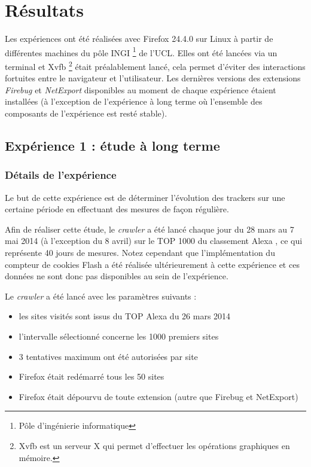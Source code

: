 \chapter{Résultats}
Les expériences ont été réalisées avec Firefox 24.4.0 sur Linux à partir de différentes machines du pôle INGI \footnote{Pôle d'ingénierie informatique} de l'UCL. Elles ont été lancées via un terminal et Xvfb \footnote{Xvfb est un serveur X qui permet d'effectuer les opérations graphiques en mémoire.} était préalablement lancé, cela permet d'éviter des interactions fortuites entre le navigateur et l'utilisateur. Les dernières versions des extensions \textit{Firebug} et \textit{NetExport} disponibles au moment de chaque expérience étaient installées (à l'exception de l'expérience à long terme où l'ensemble des composants de l'expérience est resté stable).

\section{Expérience 1 : étude à long terme}
\subsection{Détails de l'expérience}
Le but de cette expérience est de déterminer l'évolution des trackers sur une certaine période en effectuant des mesures de façon régulière.

Afin de réaliser cette étude, le \textit{crawler} a été lancé chaque jour du 28 mars au 7 mai 2014 (à l'exception du 8 avril) sur le TOP 1000 du classement Alexa \cite{AlexaTop}, ce qui représente 40 jours de mesures. Notez cependant que l'implémentation du compteur de cookies Flash a été réalisée ultérieurement à cette expérience et ces données ne sont donc pas disponibles au sein de l'expérience.
\newline

Le \textit{crawler} a été lancé avec les paramètres suivants :
\begin{itemize}
	\item les sites visités sont issus du TOP Alexa du 26 mars 2014
	\item l'intervalle sélectionné concerne les 1000 premiers sites
	\item 3 tentatives maximum ont été autorisées par site
	\item Firefox était redémarré tous les 50 sites
	\item Firefox était dépourvu de toute extension (autre que Firebug et NetExport)
	\newline
\end{itemize}

